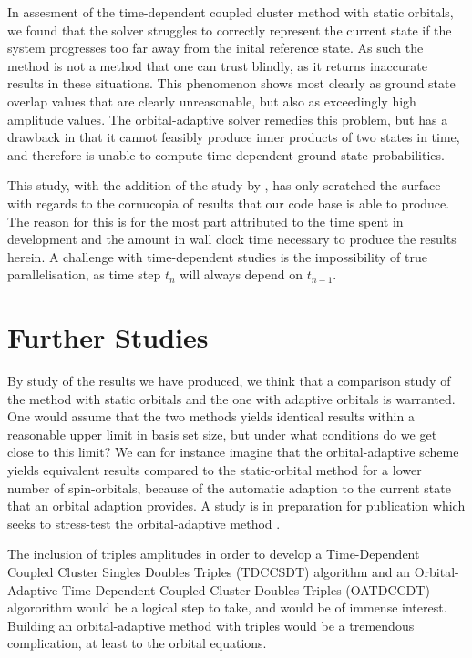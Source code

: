In assesment of the time-dependent coupled cluster method with static orbitals,
we found that the solver struggles to correctly represent the current state if 
the system progresses too far away from the inital reference state. As such the 
method is not a method that one can trust blindly, as it returns
inaccurate results in these situations. This phenomenon shows most clearly as 
ground state overlap values that are clearly unreasonable, but also as exceedingly
high amplitude values.
The orbital-adaptive solver remedies this problem, but has a drawback 
in that it cannot feasibly produce inner products of two states in time, and therefore 
is unable to compute time-dependent ground state probabilities.

This study, with the addition of the study by \citeauthor{islandwind2019}\cite{islandwind2019},
has only scratched the surface with regards to the cornucopia of results that our 
code base is able to produce. The reason for this is for the most part attributed to 
the time spent in development and the amount in wall clock time necessary to 
produce the results herein. A challenge with time-dependent studies is the 
impossibility of true parallelisation, as time step $t_n$ will always depend 
on $t_{n-1}$.

\section{Further Studies}

By study of the results we have produced, we think that a comparison study 
of the method with static orbitals and the one with adaptive orbitals is warranted.
One would assume that the two methods yields identical results within a reasonable 
upper limit in basis set size, but under what conditions do we get close to this
limit? We can for instance imagine that the orbital-adaptive scheme yields equivalent
results compared to the static-orbital method for a lower number of spin-orbitals,
because of the automatic adaption to the current state that an orbital adaption 
provides. A study is in preparation for publication which seeks to stress-test
the orbital-adaptive method \cite{islandwind2019numerically}.

The inclusion of triples amplitudes in order to develop a Time-Dependent Coupled Cluster Singles 
Doubles Triples (TDCCSDT) algorithm and an Orbital-Adaptive Time-Dependent Coupled Cluster 
Doubles Triples (OATDCCDT) algororithm would be a logical step to take, and would be of 
immense interest. Building an orbital-adaptive method with triples would be a tremendous 
complication, at least to the orbital equations.

